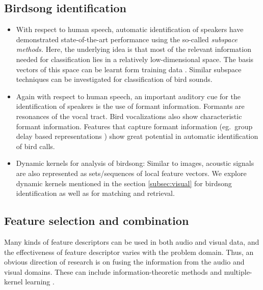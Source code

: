 \documentclass{article}
\begin{document}
\subsection{Birdsong identification}

\begin{itemize}
\item With respect to human speech, automatic identification of speakers have
demonstrated state-of-the-art performance using the so-called \emph{subspace
methods.} Here, the underlying idea is that most of the relevant information
needed for classification 
lies in a relatively low-dimensional space. The basis vectors of this space can
be learnt form training data \cite{dehak_ivector}. Similar subspace techniques
can be investigated for classification of bird sounds.
\item Again with respect to human speech, an important auditory cue for the
identification of speakers is the use of formant information. Formants are
resonances of the vocal tract. Bird vocalizations also show characteristic
formant information. Features that capture formant information (eg.~group delay
based representations \cite{padmanAllPoleGDelay, hegdeModgdf}) show great potential in
automatic identification of bird calls.

\item Dynamic kernels for analysis of birdsong: Similar to images, acoustic
signals are also represented as sets/sequences of local feature vectors. We
explore dynamic kernels mentioned in the section \ref{subsec:visual} for
birdsong identification as well as for matching and retrieval.  

\end{itemize}





\subsection{Feature selection and combination}

Many kinds of feature descriptors can be used in both audio and visual data, and
the effectiveness of feature descriptor varies with the problem domain. Thus, an
obvious direction of research is on fusing the information from the audio and visual domains.
These can include information-theoretic methods and multiple-kernel learning
\cite{LargeScaleMKL,mkl2}.

\end{document}

